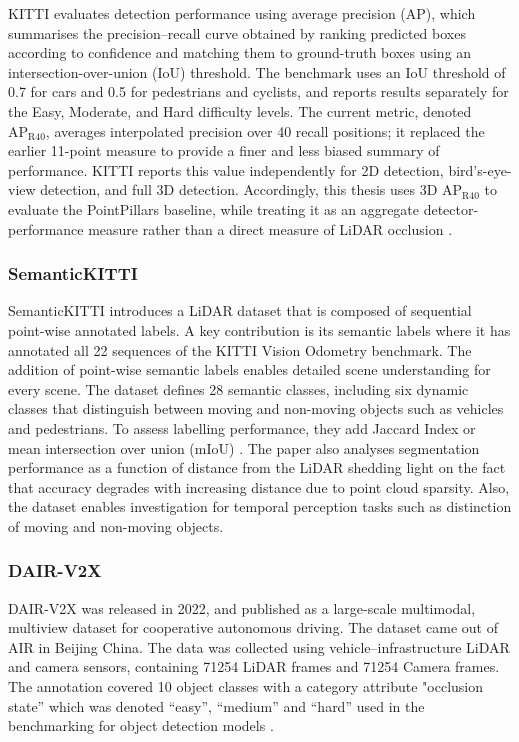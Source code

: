 \documentclass[12pt,a4paper]{article}
\begin{document}
KITTI evaluates detection performance using average precision (AP), which summarises the precision--recall curve obtained by ranking predicted boxes according to confidence and matching them to ground-truth boxes using an intersection-over-union (IoU) threshold. The benchmark uses an IoU threshold of 0.7 for cars and 0.5 for pedestrians and cyclists, and reports results separately for the Easy, Moderate, and Hard difficulty levels. The current metric, denoted \(\mathrm{AP}_{\mathrm{R40}}\), averages interpolated precision over 40 recall positions; it replaced the earlier 11-point measure to provide a finer and less biased summary of performance. KITTI reports this value independently for 2D detection, bird's-eye-view detection, and full 3D detection. Accordingly, this thesis uses 3D \(\mathrm{AP}_{\mathrm{R40}}\) to evaluate the PointPillars baseline, while treating it as an aggregate detector-performance measure rather than a direct measure of LiDAR occlusion \cite{bib_ref_14,bib_ref_29}.

\subsubsection{SemanticKITTI}

SemanticKITTI introduces a LiDAR dataset that is composed of sequential
point-wise annotated labels. A key contribution is its semantic labels
where it has annotated all 22 sequences of the KITTI Vision Odometry
benchmark. The addition of point-wise semantic labels enables detailed
scene understanding for every scene. The dataset defines 28 semantic
classes, including six dynamic classes that distinguish between moving
and non-moving objects such as vehicles and pedestrians. To assess
labelling performance, they add Jaccard Index or mean intersection over
union (mIoU) \cite{bib_ref_15}. The paper also analyses
segmentation performance as a function of distance from the LiDAR
shedding light on the fact that accuracy degrades with increasing
distance due to point cloud sparsity. Also, the dataset enables
investigation for temporal perception tasks such as distinction of
moving and non-moving objects.

\subsubsection{DAIR-V2X}

DAIR-V2X was released in 2022, and published as a large-scale
multimodal, multiview dataset for cooperative autonomous driving.
The dataset came out of AIR in Beijing China. The data was collected
using vehicle--infrastructure LiDAR and camera sensors, containing 71254 LiDAR
frames and 71254 Camera frames. The annotation covered 10 object classes
with a category attribute "occlusion state'' which was denoted
``easy'', ``medium'' and ``hard'' used in the benchmarking for object
detection models \cite{bib_ref_16}.
\end{document}
